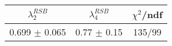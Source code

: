 \begin{tabular}{c|c||c}
$\lambda_{2}^{RSB}$ & $\lambda_4^{RSB}$ & $\chi^{2}$/ndf \\
\hline
0.699 $\pm$ 0.065 & 0.77 $\pm$ 0.15 & 135/99\\
\end{tabular}
